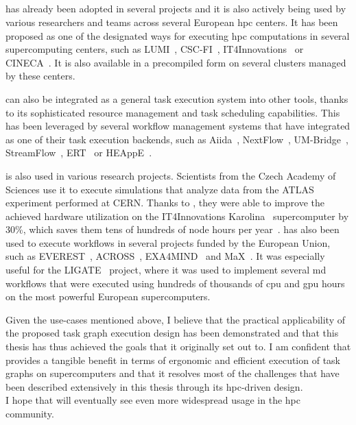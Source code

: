 \vspace{-2mm}\subsection*{\hyperqueue{}}
\hyperqueue{} has already been adopted in several projects and it is also actively
being used by various researchers and teams across several European \gls{hpc}
centers. It has been proposed as one of the designated ways for executing
\gls{hpc} computations in several supercomputing centers, such as
LUMI~\cite{it4i-lumi}, CSC-FI~\cite{puhti-hq,puhti-hq-2},
IT4Innovations~\cite{it4i-hq} or CINECA~\cite{cineca}. It is also
available in a precompiled form on several clusters managed by these centers.

\hyperqueue{} can also be integrated as a general task execution system into other
tools, thanks to its sophisticated resource management and task scheduling capabilities. This has
been leveraged by several workflow management systems that have integrated
\hyperqueue{} as one of their task execution backends, such as
Aiida~\cite{aiida-hq}, NextFlow~\cite{nextflow-hq},
UM-Bridge~\cite{umbridge}, StreamFlow~\cite{streamflow-hq},
ERT~\cite{ert} or HEAppE~\cite{heappe_hq}.

\hyperqueue{} is also used in various research projects. Scientists from the Czech
Academy of Sciences use it to execute simulations that analyze data from the
ATLAS~\cite{atlas} experiment performed at CERN. Thanks to
\hyperqueue{}, they were able to improve the achieved hardware utilization on the
IT4Innovations Karolina~\cite{karolina} supercomputer by 30\%, which saves them tens of
hundreds of node hours per year~\cite{cern-hq}. \hyperqueue{} has also
been used to execute workflows in several projects funded by the European Union, such as
EVEREST~\cite{everest}, ACROSS~\cite{across},
EXA4MIND~\cite{exa4mind} and MaX~\cite{max}. It was especially useful
for the LIGATE~\cite{ligate} project, where it was used to implement several
\gls{md} workflows that were executed using hundreds of thousands of
\gls{cpu} and \gls{gpu} hours on the most powerful European
supercomputers.

Given the use-cases mentioned above, I believe that the practical applicability of the proposed
task graph execution design has been demonstrated and that this thesis has thus achieved the goals
that it originally set out to. I am confident that \hyperqueue{} provides a tangible
benefit in terms of ergonomic and efficient execution of task graphs on supercomputers and that it
resolves most of the challenges that have been described extensively in this thesis through its
\gls{hpc}-driven design. \\
I hope that \hyperqueue{} will eventually see even more widespread usage in the \gls{hpc} community.
